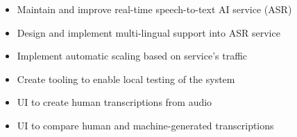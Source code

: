 \documentclass[10pt,letterpaper,ragged2d,withhyper]{altacv}
\begin{document}
\begin{paracol}{2}

\begin{itemize}
\item Maintain and improve real-time speech-to-text AI service (ASR)
\item Design and implement multi-lingual support into ASR service
\item Implement automatic scaling based on service's traffic
\item Create tooling to enable local testing of the system
\item UI to create human transcriptions from audio
\item UI to compare human and machine-generated transcriptions
\end{itemize}


\divider


\end{paracol}
\end{document}
